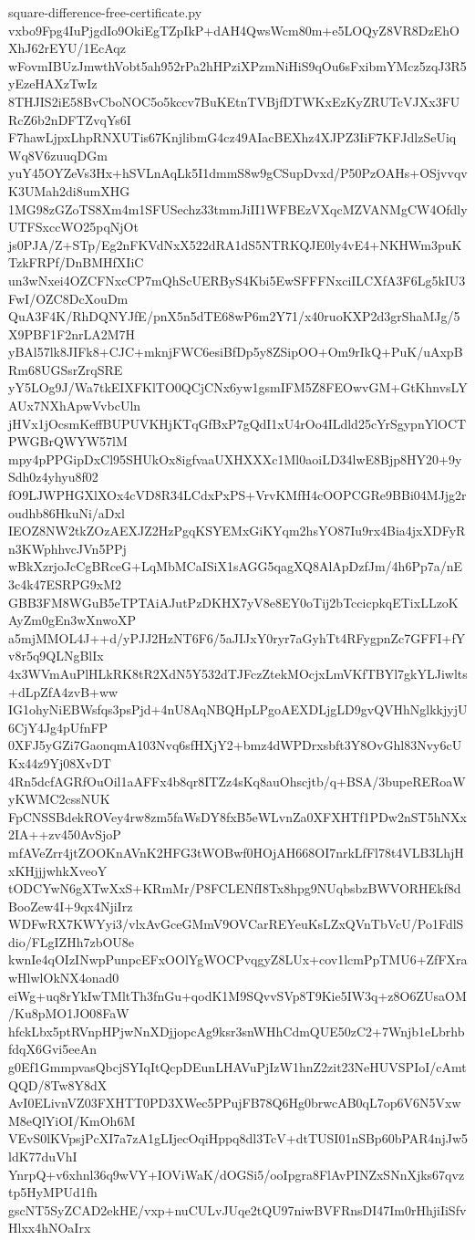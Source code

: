 \documentclass[11pt]{article}
\theoremstyle{definition}
\theoremstyle{remark}
\begin{document}
\begin{filecontents*}[overwrite]{square-difference-free-certificate.py}
vxbo9Fpg4IuPjgdIo9OkiEgTZpIkP+dAH4QwsWcm80m+e5LOQyZ8VR8DzEhOXhJ62rEYU/1EcAqz
wFovmIBUzJmwthVobt5ah952rPa2hHPziXPzmNiHiS9qOu6sFxibmYMcz5zqJ3R5yEzeHAXzTwIz
8THJIS2iE58BvCboNOC5o5kccv7BuKEtnTVBjfDTWKxEzKyZRUTcVJXx3FURcZ6b2nDFTZvqYs6I
F7hawLjpxLhpRNXUTis67KnjlibmG4cz49AIacBEXhz4XJPZ3IiF7KFJdlzSeUiqWq8V6zuuqDGm
yuY45OYZeVs3Hx+hSVLnAqLk5I1dmmS8w9gCSupDvxd/P50PzOAHs+OSjvvqvK3UMah2di8umXHG
1MG98zGZoTS8Xm4m1SFUSechz33tmmJiII1WFBEzVXqcMZVANMgCW4OfdlyUTFSxccWO25pqNjOt
js0PJA/Z+STp/Eg2nFKVdNxX522dRA1dS5NTRKQJE0ly4vE4+NKHWm3puKTzkFRPf/DnBMHfXIiC
un3wNxei4OZCFNxcCP7mQhScUERByS4Kbi5EwSFFFNxciILCXfA3F6Lg5kIU3FwI/OZC8DcXouDm
QuA3F4K/RhDQNYJfE/pnX5n5dTE68wP6m2Y71/x40ruoKXP2d3grShaMJg/5X9PBF1F2nrLA2M7H
yBAl57lk8JIFk8+CJC+mknjFWC6esiBfDp5y8ZSipOO+Om9rIkQ+PuK/uAxpBRm68UGSsrZrqSRE
yY5LOg9J/Wa7tkEIXFKlTO0QCjCNx6yw1gsmIFM5Z8FEOwvGM+GtKhnvsLYAUx7NXhApwVvbcUln
jHVx1jOcsmKeffBUPUVKHjKTqGfBxP7gQdI1xU4rOo4ILdld25cYrSgypnYlOCTPWGBrQWYW57lM
mpy4pPPGipDxCl95SHUkOx8igfvaaUXHXXXc1Ml0aoiLD34lwE8Bjp8HY20+9ySdh0z4yhyu8f02
fO9LJWPHGXlXOx4cVD8R34LCdxPxPS+VrvKMfH4cOOPCGRe9BBi04MJjg2roudhb86HkuNi/aDxl
IEOZ8NW2tkZOzAEXJZ2HzPgqKSYEMxGiKYqm2hsYO87Iu9rx4Bia4jxXDFyRn3KWphhvcJVn5PPj
wBkXzrjoJcCgBRceG+LqMbMCaISiX1sAGG5qagXQ8AlApDzfJm/4h6Pp7a/nE3c4k47ESRPG9xM2
GBB3FM8WGuB5eTPTAiAJutPzDKHX7yV8e8EY0oTij2bTccicpkqETixLLzoKAyZm0gEn3wXnwoXP
a5mjMMOL4J++d/yPJJ2HzNT6F6/5aJIJxY0ryr7aGyhTt4RFygpnZc7GFFI+fYv8r5q9QLNgBlIx
4x3WVmAuPlHLkRK8tR2XdN5Y532dTJFczZtekMOcjxLmVKfTBYl7gkYLJiwlts+dLpZfA4zvB+ww
IG1ohyNiEBWsfqs3psPjd+4nU8AqNBQHpLPgoAEXDLjgLD9gvQVHhNglkkjyjU6CjY4Jg4pUfnFP
0XFJ5yGZi7GaonqmA103Nvq6sfHXjY2+bmz4dWPDrxsbft3Y8OvGhl83Nvy6cUKx44z9Yj08XvDT
4Rn5dcfAGRfOuOil1aAFFx4b8qr8ITZz4sKq8auOhscjtb/q+BSA/3bupeRERoaWyKWMC2cssNUK
FpCNSSBdekROVey4rw8zm5faWsDY8fxB5eWLvnZa0XFXHTf1PDw2nST5hNXx2IA++zv450AvSjoP
mfAVeZrr4jtZOOKnAVnK2HFG3tWOBwf0HOjAH668OI7nrkLfFl78t4VLB3LhjHxKHjjjwhkXveoY
tODCYwN6gXTwXxS+KRmMr/P8FCLENfI8Tx8hpg9NUqbsbzBWVORHEkf8dBooZew4I+9qx4NjiIrz
WDFwRX7KWYyi3/vlxAvGceGMmV9OVCarREYeuKsLZxQVnTbVcU/Po1FdlSdio/FLgIZHh7zbOU8e
kwnIe4qOIzINwpPunpcEFxOOlYgWOCPvqgyZ8LUx+cov1lcmPpTMU6+ZfFXrawHlwlOkNX4onad0
eiWg+uq8rYkIwTMltTh3fnGu+qodK1M9SQvvSVp8T9Kie5IW3q+z8O6ZUsaOM/Ku8pMO1JO08FaW
hfckLbx5ptRVnpHPjwNnXDjjopcAg9ksr3snWHhCdmQUE50zC2+7Wnjb1eLbrhbfdqX6Gvi5eeAn
g0Ef1GmmpvasQbcjSYIqItQcpDEunLHAVuPjIzW1hnZ2zit23NeHUVSPIoI/cAmtQQD/8Tw8Y8dX
AvI0ELivnVZ03FXHTT0PD3XWec5PPujFB78Q6Hg0brwcAB0qL7op6V6N5VxwM8eQlYiOI/KmOh6M
VEvS0lKVpsjPcXI7a7zA1gLIjecOqiHppq8dl3TcV+dtTUSI01nSBp60bPAR4njJw5ldK77duVhI
YnrpQ+v6xhnl36q9wVY+IOViWaK/dOGSi5/ooIpgra8FlAvPINZxSNnXjks67qvztp5HyMPUd1fh
gscNT5SyZCAD2ekHE/vxp+nuCULvJUqe2tQU97niwBVFRnsDI47Im0rHhjiIiSfvHlxx4hNOaIrx

\end{filecontents*}
\end{document}
